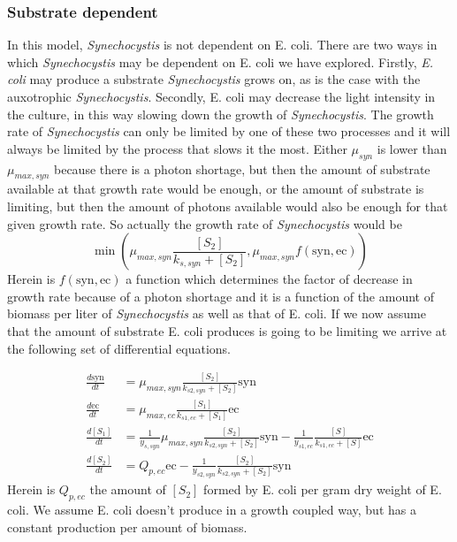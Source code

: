 \documentclass[12pt]{report}
\begin{document}
\subsubsection{Substrate dependent}
In this model, \textit{Synechocystis} is not dependent on E. coli. There are two ways in which \textit{Synechocystis} may be dependent on E. coli we have explored.
Firstly, \textit{E. coli} may produce a substrate \textit{Synechocystis} grows on, as is the case with the auxotrophic \textit{Synechocystis}. Secondly, E. coli may decrease the light intensity in the culture, in this way slowing down the growth of \textit{Synechocystis}. The growth rate of \textit{Synechocystis} can only be limited by one of these two processes and it will always be limited by the process that slows it the most. Either $\mu_{syn}$ is lower than $\mu_{max,syn}$ because there is a photon shortage, but then the amount of substrate available at that growth rate would be enough, or the amount of substrate is limiting, but then the amount of photons available would also be enough for that given growth rate. So actually the growth rate of \textit{Synechocystis} would be 
\begin{equation}\label{eq:min}
 \min(\mu_{max,syn}\frac{[S_{2}]}{k_{s,syn}+[S_2]}, \mu_{max,syn}f(\text{syn},\text{ec}))
\end{equation}
Herein is $f(\text{syn},\text{ec})$ a function which determines the factor of decrease in growth rate because of a photon shortage and it is a function of the amount of biomass per liter of \textit{Synechocystis} as well as that of E. coli.
If we now assume that the amount of substrate E. coli produces is going to be limiting we arrive at the following set of differential equations.

\begin{align} \label{eq:sd}
 \frac{d\text{syn}}{dt} &= \mu_{max,syn} \frac{[S_2]}{k_{s2,syn}+[S_2]} \text{syn} \\
 \frac{d\text{ec}}{dt} &= \mu_{max,ec} \frac{[S_1]}{k_{s1,ec}+[S_1]} \text{ec} \\
 \frac{d[S_1]}{dt} &= \frac{1}{y_{s,syn}} \mu_{max,syn} \frac{[S_2]}{k_{s2,syn}+[S_2]} \text{syn} - \frac{1}{y_{s1,ec}} \frac{[S]}{k_{s1,ec}+[S]} \text{ec} \\
 \frac{d[S_2]}{dt} &=  Q_{p,ec} \text{ec} - \frac{1}{y_{s2,syn}} \frac{[S_2]}{k_{s2,syn}+[S_2]} \text{syn}
\end{align}
Herein is  $Q_{p,ec}$ the amount of $[S_2]$ formed by E. coli per gram dry weight of E. coli. We assume E. coli doesn't produce in a growth coupled way, but has a constant production per amount of biomass.
\end{document}
